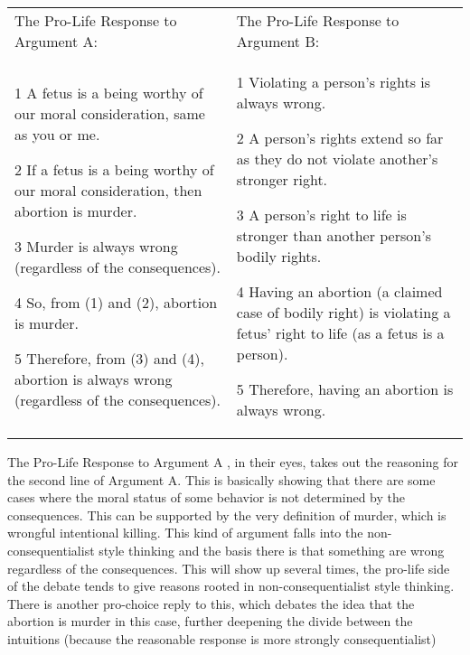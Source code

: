 \begin{tabular}{p{2in}|p{2in}}
The Pro-Life Response to Argument A:&The Pro-Life Response to Argument B:\\
\begin{earg}
    \item[1 ] A fetus is a being worthy of our moral consideration, same as you or me.
    \item[2 ] If a fetus is a being worthy of our moral consideration, then abortion is murder.
    \item[3 ] Murder is always wrong (regardless of the consequences).
    \item[4 ] So, from (1) and (2), abortion is murder.
    \item[5 ] Therefore, from (3) and (4), abortion is always wrong (regardless of the consequences). 
\end{earg}&
\begin{earg}
    \item[1 ] Violating a person's rights is always wrong.
    \item[2 ] A person's rights extend so far as they do not violate another's stronger right.
    \item[3 ] A person's right to life is stronger than another person's bodily rights.
    \item[4 ] Having an abortion (a claimed case of bodily right) is violating a fetus' right to life (as a fetus is a person).
    \item[5 ] Therefore, having an abortion is always wrong.
\end{earg}
\end{tabular}
The Pro-Life Response to Argument A , in their eyes, takes out the reasoning for the second line of Argument A. This is basically showing that there are some cases where the moral status of some behavior is not determined by the consequences. This can be supported by the very definition of murder, which is wrongful intentional killing. This kind of argument falls into the non-consequentialist style thinking and the basis there is that something are wrong regardless of the consequences. This will show up several times, the pro-life side of the debate tends to give reasons rooted in non-consequentialist style thinking. There is another pro-choice reply to this, which debates the idea that the abortion is murder in this case, further deepening the divide between the intuitions (because the reasonable response is more strongly consequentialist) 

